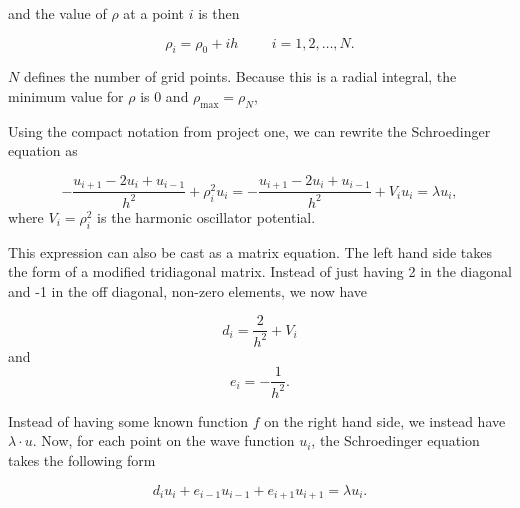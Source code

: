 \documentclass[%
oneside,                 %
final,                   %
10pt]{article}
\begin{document}
and the value of $\rho$ at a point $i$ is then 

\[
    \rho_i= \rho_0 + ih \hspace{1cm} i=1,2,\dots , N.
\]

$N$ defines the number of grid points. Because this is a radial integral, the minimum value for $\rho$ is 0 and  $\rho_{\mathrm{max}}=\rho_N$,

Using the compact notation from project one, we can rewrite the Schroedinger equation as

\[
-\frac{u_{i+1} -2u_i +u_{i-1}}{h^2}+\rho_i^2u_i=-\frac{u_{i+1} -2u_i +u_{i-1} }{h^2}+V_iu_i  = \lambda u_i,
\]
where $V_i=\rho_i^2$ is the harmonic oscillator potential.

This expression can also be cast as a matrix equation.  The left hand side takes the form of a modified tridiagonal matrix.  Instead of just having 2 in the diagonal and -1 in the off diagonal, non-zero elements, we now have 

\begin{equation*}
   d_i=\frac{2}{h^2}+V_i
\end{equation*}
and 
\begin{equation*}
   e_i=-\frac{1}{h^2}.
\end{equation*}

Instead of having some known function $f$ on the right hand side, we instead have $\lambda \cdot u$.  Now, for each point on the wave function $u_i$, the Schroedinger equation takes the following form

\begin{equation*}
d_iu_i+e_{i-1}u_{i-1}+e_{i+1}u_{i+1}  = \lambda u_i.
\end{equation*}
\end{document}

